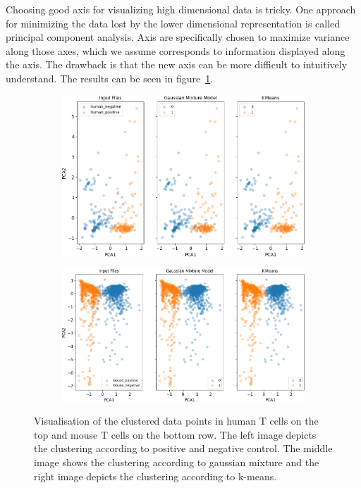 Choosing good axis for visualizing high dimensional data is tricky. One approach for minimizing the data lost by the lower dimensional representation is called principal component analysis. Axis are specifically chosen to maximize variance along those axes, which we assume corresponds to information displayed along the axis. The drawback is that the new axis can be more difficult to intuitively understand. The results can be seen in figure~\ref{fig:vis_output_seperate}.
	
\begin{figure}
	\centering
	\begin{subfigure}{\linewidth}
		\includegraphics[width=\textwidth]{fig/separate_human}
	\end{subfigure}
	\hfill
	
	\vspace{0.5cm}
	\begin{subfigure}{\linewidth}
		\includegraphics[width=\textwidth]{fig/separate_mouse}
	\end{subfigure}
	
	\caption{Visualisation of the clustered data points in human T cells on the top and mouse T cells on the bottom row. The left image depicts the clustering according to positive and negative control. The middle image shows the clustering according to gaussian mixture and the right image depicts the clustering according to k-means.}
	\label{fig:vis_output_seperate}
\end{figure}

